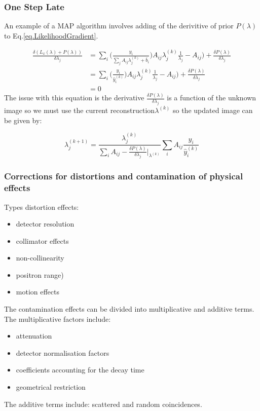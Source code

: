 \documentclass{article}
\begin{document}
\subsubsection{One Step Late}
An example of a MAP algorithm involves adding of the derivitive of prior $P(\lambda)$ to Eq.\ref{eq.LikelihoodGradient}.

\begin{equation} \label{eq.OneStepLate}
\begin{split}
\frac{\delta( L_x(\lambda) + P(\lambda))}{\delta\lambda_j} & = \sum_i \bigg( \frac{y_i}{\sum_j A_{ij}\lambda_j^{(k)} + \bar{b}_i}\bigg) A_{ij}\lambda_j^{(k)} \frac{1}{\lambda_j} - A_{ij}\bigg)  + \frac{\delta P(\lambda)}{\delta \lambda_j} \\
&= \sum_i \bigg( \frac{y_i}{\hat{y}_i^{(k)}}\bigg) A_{ij}\lambda_j^{(k)} \frac{1}{\lambda_j} - A_{ij}\bigg)  + \frac{\delta P(\lambda)}{\delta \lambda_j}\\
&= 0
\end{split}
\end{equation}
The issue with this equation is the derivative $\frac{\delta P(\lambda)}{\delta \lambda_j}$ is a function of the unknown image so we must use the current reconstruction$\lambda^{(k)}$ so the updated image can be given by:

\begin{equation}
\lambda_j^{(k+1)} = \frac{\lambda_j^{(k)}}{ \sum_i A_{ij} - \frac{\delta P(\lambda)}{\delta \lambda_j}\bigg|_{\lambda^{(k)}} }  \sum_i A_{ij} \frac{y_i}{\hat{y}_i^{(k)}}
\end{equation}
\subsubsection{Corrections for distortions and contamination of physical effects}
Types distortion effects:

\begin{itemize}
\item detector resolution 
\item collimator effects
\item non-collinearity  
\item positron range) 
\item motion effects
\end{itemize}

The contamination effects can be divided into multiplicative and additive terms. 
The multiplicative factors include: 
\begin{itemize}
\item attenuation
\item detector normalisation factors
\item coefficients accounting for the decay time
\item geometrical restriction
\end{itemize}
The additive terms include: scattered and random coincidences.
\end{document}
